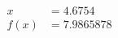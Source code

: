 \documentclass[preview]{standalone}
\begin{document}
\begin{align*}
x &= 4.6754\\f(x) &= 7.9865878
\end{align*}
\end{document}
